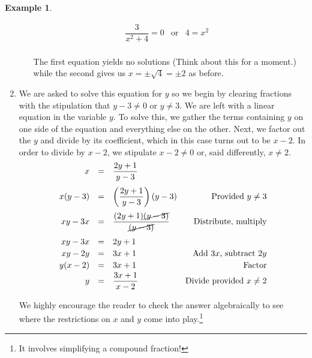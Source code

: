 \documentclass[11pt]{article}
\theoremstyle{definition}  %
\newtheorem{ex}{\bf Example}
\begin{document}
\begin{ex}
\begin{enumerate}
\begin{itemize}
\[\begin{array}{rclr}
\dfrac{3}{x^2+4} = 0 & \text{or} & 4 = x^2 & \\ \end{array} \]

The first equation yields no solutions (Think about this for a moment.) while the second gives us $x = \pm \sqrt{4} = \pm 2$ as before.


\end{itemize}

\item  We are asked to solve this equation for $y$ so we begin by clearing fractions with the stipulation that $y-3 \neq 0$ or $y \neq 3$.   We are left with a linear equation in the variable $y$.  To solve this, we gather the terms containing $y$ on one side of the equation and everything else on the other.  Next, we factor out the $y$ and divide by its coefficient, which in this case turns out to be $x-2$.  In order to divide by $x-2$, we stipulate $x - 2 \neq 0$ or, said differently, $x \neq 2$. \[ \begin{array}{rclr}

 x & = & \dfrac{2y+1}{y-3} & \\ [12pt]

x(y-3) & = & \left(\dfrac{2y+1}{y-3}\right)(y-3) & \text{Provided $y \neq 3$} \\ [12pt]

xy - 3x & = & \dfrac{(2y+1)\cancel{(y-3)}}{\cancel{(y-3)}} & \text{Distribute, multiply} \\ [12pt]

xy - 3x & = & 2y + 1 & \\ [2pt]

xy - 2y & = & 3x+1 & \text{Add $3x$, subtract $2y$} \\ [2pt]

y(x-2) & = & 3x+1 & \text{Factor} \\ [2pt]

y & = & \dfrac{3x+1}{x-2} & \text{Divide provided $x \neq 2$} \\

\end{array}\]

We highly encourage the reader to check the answer algebraically to see where the restrictions on $x$ and $y$ come into play.\footnote{It involves simplifying a compound fraction!}


\end{enumerate}
\end{ex}
\end{document}
